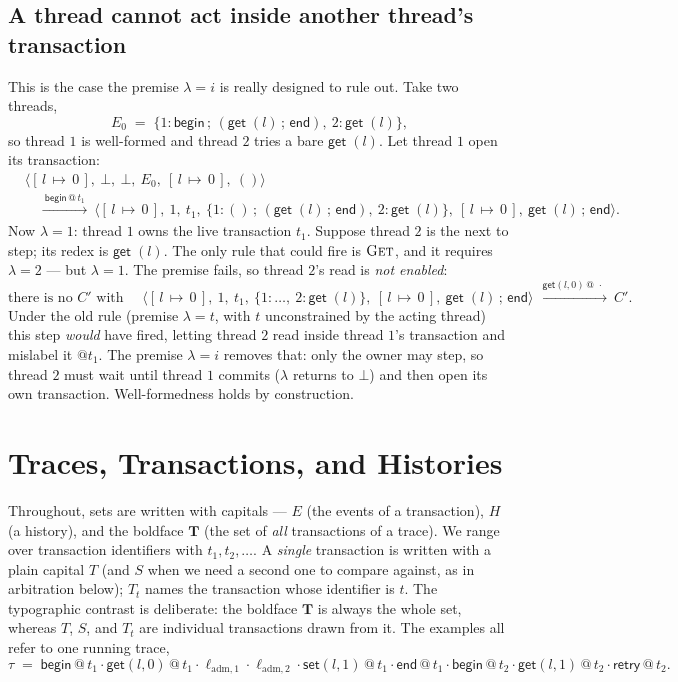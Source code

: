 \documentclass[manuscript,nonacm]{acmart}
\makeatletter
\theoremstyle{acmdefinition}
\newcommand{\unit}{()}
\newcommand{\bbegin}{\textsf{begin}}
\newcommand{\eend}{\textsf{end}}
\newcommand{\retry}{\textsf{retry}}
\newcommand{\getc}[1]{\textsf{get}\;(#1)}
\newcommand{\getev}[3]{\textsf{get}(#1,#2)\,@\,#3}
\newcommand{\setev}[3]{\textsf{set}(#1,#2)\,@\,#3}
\newcommand{\st}[1]{[\,l\,{\mapsto}\,#1\,]}          %
\newcommand{\emap}[1]{\{#1\}}                          %
\newcommand{\ladm}[1][]{\ell_{\mathrm{adm}#1}}       %
\makeatother
\begin{document}
\subsection{A thread cannot act inside another thread's transaction}

This is the case the premise $\lambda = i$ is really designed to rule out. Take
two threads,
\[
E_0 \;=\; \emap{1{:}\bbegin\,;\,(\getc{l}\,;\,\eend),\ 2{:}\getc{l}} ,
\]
so thread $1$ is well-formed and thread $2$ tries a bare $\getc{l}$. Let thread
$1$ open its transaction:
{\small
\[
\begin{aligned}
&\langle \st{0},\ \bot,\ \bot,\ E_0,\ \st{0},\ \unit\rangle\\
&\quad\xrightarrow{\ \bbegin\,@\,t_1\ }\
\langle \st{0},\ 1,\ t_1,\ \emap{1{:}\unit\,;\,(\getc{l}\,;\,\eend),\ 2{:}\getc{l}},\ \st{0},\ \getc{l}\,;\,\eend\rangle .
\end{aligned}
\]}%
Now $\lambda = 1$: thread $1$ owns the live transaction $t_1$. Suppose thread $2$
is the next to step; its redex is $\getc{l}$. The only rule that could
fire is $\textsc{Get}$, and it requires $\lambda = 2$ --- but $\lambda = 1$. The
premise fails, so thread $2$'s read is \emph{not enabled}:
\[
\text{there is no } C' \text{ with }\quad
\langle \st{0},\ 1,\ t_1,\ \emap{1{:}\dots,\ 2{:}\getc{l}},\ \st{0},\ \getc{l}\,;\,\eend\rangle
\ \xrightarrow{\ \getev{l}{0}{\,\cdot\,}\ }\ C' .
\]
Under the old rule (premise $\lambda = t$, with $t$ unconstrained by the acting
thread) this step \emph{would} have fired, letting thread $2$ read inside thread
$1$'s transaction and mislabel it $@t_1$. The premise $\lambda = i$ removes that:
only the owner may step, so thread $2$ must wait until thread $1$ commits
($\lambda$ returns to $\bot$) and then open its own transaction. Well-formedness
holds by construction.

\section{Traces, Transactions, and Histories}
\label{sec:history}

Throughout, sets are written with capitals --- $E$ (the events of a transaction),
$H$ (a history), and the boldface $\mathbf{T}$ (the set of \emph{all} transactions
of a trace). We range over transaction identifiers with $t_1, t_2, \dots$. A
\emph{single} transaction is written with a plain capital $T$ (and $S$ when we need
a second one to compare against, as in arbitration below); $T_{t}$ names the
transaction whose identifier is $t$. The typographic contrast is deliberate: the
boldface $\mathbf{T}$ is always the whole set, whereas $T$, $S$, and $T_{t}$ are
individual transactions drawn from it. The examples all refer to one running trace,
\[
\tau \;=\; \bbegin\,@\,t_1 \cdot \getev{l}{0}{t_1} \cdot \ladm[,1] \cdot \ladm[,2] \cdot
\setev{l}{1}{t_1} \cdot \eend\,@\,t_1 \cdot \bbegin\,@\,t_2 \cdot \getev{l}{1}{t_2}
\cdot \retry\,@\,t_2 .
\]
\end{document}
